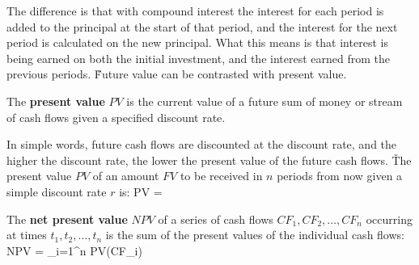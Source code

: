 The difference is that with compound interest the interest for each period is added to the principal at the start of
that period, and the interest for the next period is calculated on the new principal. What this means is that
interest is being earned on both the initial investment, and the interest earned from the previous periods. \v

Future value can be contrasted with present value.

The \textbf{present value} $PV$ is the current value of a future sum of money or stream of cash flows given a specified
discount rate.
\ed

In simple words, future cash flows are discounted at the discount rate, and the higher the discount rate, the lower
the present value of the future cash flows. \v

The present value $PV$ of an amount $FV$ to be received in $n$ periods from now given a simple discount rate $r$ is:
\bse
PV = 
\ese

The \textbf{net present value} $NPV$ of a series of cash flows $CF_1, CF_2, \ldots, CF_n$ occurring at times
$t_1, t_2, \ldots, t_n$ is the sum of the present values of the individual cash flows:
\bse
NPV = \sum_{i=1}^n PV(CF_i)
\ese
\ed